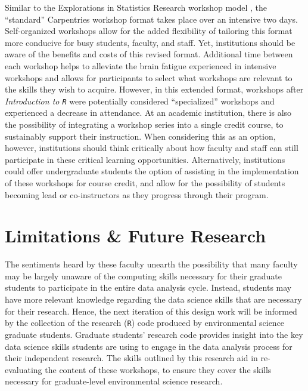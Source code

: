 \documentclass[12pt]{article}
\begin{document}
\quad Similar to the Explorations in Statistics Research workshop model 
\citep{esr}, the ``standard'' Carpentries workshop format takes place over an 
intensive two days. Self-organized workshops allow for the added flexibility of 
tailoring this format more conducive for busy students, faculty, and staff.
Yet, institutions should be aware of the benefits and costs of this 
revised format. Additional time between each workshop helps to alleviate the
brain fatigue experienced in intensive workshops and allows for participants to 
select what workshops are relevant to the skills they wish to acquire. However, 
in this extended format, workshops after \emph{Introduction to \texttt{R}} 
were potentially considered ``specialized'' workshops and experienced a 
decrease in attendance. At an academic institution, there is also the
possibility of integrating a workshop series into a single credit course, to 
sustainably support their instruction. When considering this as an option, 
however, institutions should think critically about how faculty and staff can 
still participate in these critical learning opportunities. Alternatively,
institutions could offer undergraduate students the option of assisting in the 
implementation of these workshops for course credit, and allow for the
possibility of students becoming lead or co-instructors as they progress through
their program. 

\section{Limitations \& Future Research} 
\label{sec:future}

\quad The sentiments heard by these faculty unearth the possibility that many
faculty may be largely unaware of the computing skills necessary for their 
graduate students to participate in the entire data analysis cycle. Instead, 
students may have more relevant knowledge regarding the data science skills that
are necessary for their research. Hence, the next iteration of this design work
will be informed by the collection of the research (\texttt{R}) code produced by
environmental science graduate students. Graduate students' research code
provides insight into the key data science skills students are using to engage 
in the data analysis process for their independent research. The skills outlined
by this research aid in re-evaluating the content of these workshops, to ensure
they cover the skills necessary for graduate-level environmental science
research. 
\end{document}
